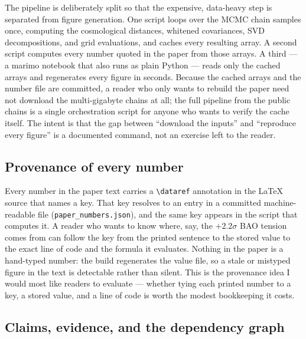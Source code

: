 The pipeline is deliberately split so that the expensive, data-heavy step is
separated from figure generation. One script loops over the MCMC chain samples
once, computing the cosmological distances, whitened covariances, SVD
decompositions, and grid evaluations, and caches every resulting array. A second
script computes every number quoted in the paper from those arrays. A third --- a
marimo notebook that also runs as plain Python --- reads only the cached arrays
and regenerates every figure in seconds. Because the cached arrays and the number
file are committed, a reader who only wants to rebuild the paper need not download
the multi-gigabyte chains at all; the full pipeline from the public chains is a
single orchestration script for anyone who wants to verify the cache itself. The
intent is that the gap between ``download the inputs'' and ``reproduce every
figure'' is a documented command, not an exercise left to the reader.

\subsection{Provenance of every number}
\label{app:number_provenance}

Every number in the paper text carries a \texttt{\textbackslash dataref}
annotation in the LaTeX source that names a key. That key resolves to an entry in
a committed machine-readable file (\texttt{paper\_numbers.json}), and the same key
appears in the script that computes it. A reader who wants to know where, say, the
$+2.2\sigma$ BAO \czero tension comes from can follow the key from the printed
sentence to the stored value to the exact line of code and the formula it
evaluates. Nothing in the paper is a hand-typed number: the build regenerates the
value file, so a stale or mistyped figure in the text is detectable rather than
silent. This is the provenance idea I would most like readers to evaluate ---
whether tying each printed number to a key, a stored value, and a line of code is
worth the modest bookkeeping it costs.

\subsection{Claims, evidence, and the dependency graph}
\label{app:claims_structure}

